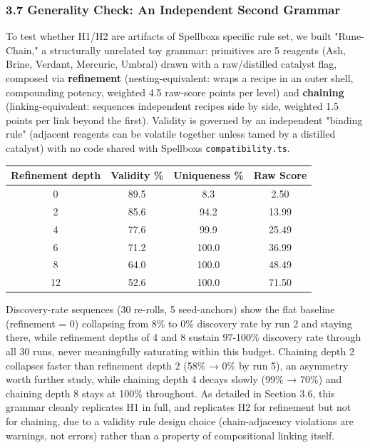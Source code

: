 \documentclass[
  10pt,
  twocolumn]{article}
\begin{document}
\subsubsection{3.7 Generality Check: An Independent Second
Grammar}\label{37-generality-check-an-independent-second-grammar}

To test whether H1/H2 are artifacts of Spellbox\textquotesingle s
specific rule set, we built "Rune-Chain," a structurally unrelated toy
grammar: primitives are 5 reagents (Ash, Brine, Verdant, Mercuric,
Umbral) drawn with a raw/distilled catalyst flag, composed via
\textbf{refinement} (nesting-equivalent: wraps a recipe in an outer
shell, compounding potency, weighted 4.5 raw-score points per level) and
\textbf{chaining} (linking-equivalent: sequences independent recipes
side by side, weighted 1.5 points per link beyond the first). Validity
is governed by an independent "binding rule" (adjacent reagents can be
volatile together unless tamed by a distilled catalyst) with no code
shared with Spellbox\textquotesingle s \texttt{compatibility.ts}.

\begin{table}[t]
\centering
\begin{tabular}{@{}cccc@{}}
\toprule
Refinement depth & Validity \% & Uniqueness \% & Raw Score \\
\midrule
0 & 89.5 & 8.3 & 2.50 \\
2 & 85.6 & 94.2 & 13.99 \\
4 & 77.6 & 99.9 & 25.49 \\
6 & 71.2 & 100.0 & 36.99 \\
8 & 64.0 & 100.0 & 48.49 \\
12 & 52.6 & 100.0 & 71.50 \\
\bottomrule
\end{tabular}
\end{table}

Discovery-rate sequences (30 re-rolls, 5 seed-anchors) show the flat
baseline (refinement = 0) collapsing from 8\% to 0\% discovery rate by
run 2 and staying there, while refinement depths of 4 and 8 sustain
97-100\% discovery rate through all 30 runs, never meaningfully
saturating within this budget. Chaining depth 2 collapses faster than
refinement depth 2 (58\% → 0\% by run 5), an asymmetry worth further
study, while chaining depth 4 decays slowly (99\% → 70\%) and chaining
depth 8 stays at 100\% throughout. As detailed in Section 3.6, this
grammar cleanly replicates H1 in full, and replicates H2 for refinement
but not for chaining, due to a validity rule design choice
(chain-adjacency violations are warnings, not errors) rather than a
property of compositional linking itself.
\end{document}
